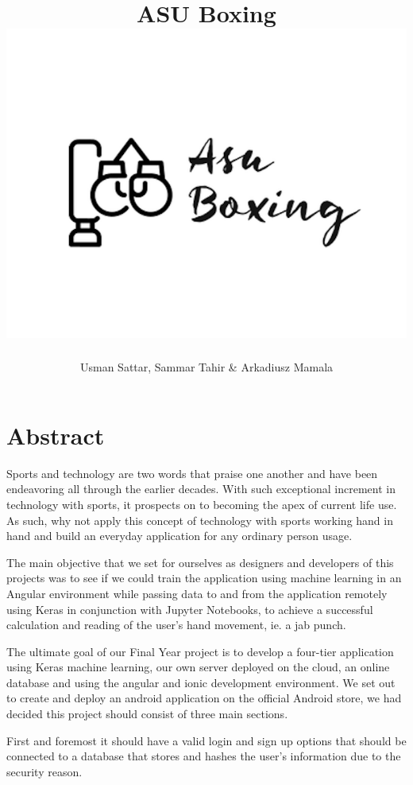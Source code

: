 \documentclass[a4paper,12pt]{report}
\begin{document}
\title{ASU Boxing \\ \includegraphics[width=0.5\columnwidth]{images/logo.png}}
\author{Usman Sattar, Sammar Tahir \& Arkadiusz Mamala}

\maketitle
\preface
\section*{Abstract}
Sports and technology are two words that praise one another and have been endeavoring all through the earlier decades. With such exceptional increment in technology with sports, it prospects on to becoming the apex of current life use. As such, why not apply this concept of technology with sports working hand in hand and build an everyday application for any ordinary person usage.

The main objective that we set for ourselves as designers and developers of this projects was to see if we could train the application using machine learning in an Angular environment while passing 
data to and from the application remotely using Keras in conjunction with Jupyter Notebooks, to achieve a successful calculation and reading of the user's hand movement, ie. a jab punch.

The ultimate goal of our Final Year project is to develop a four-tier application using Keras machine learning, our own server deployed on the cloud, an online database and using the angular and ionic development environment.
We set out to create and deploy an android application on the official Android store, we had decided this project should consist of three main sections.

First and foremost it should have a valid login and sign up options that should be connected to a database that stores and hashes the user's information due to the security reason. 
\end{document}

